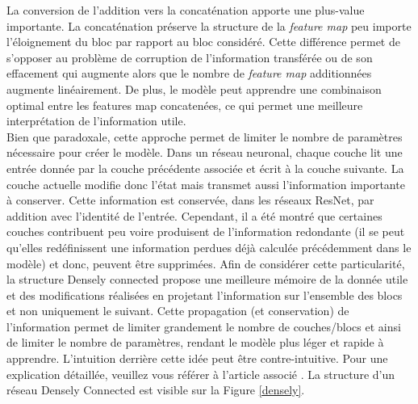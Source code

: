 \noindent La conversion de l'addition vers la concaténation apporte une plus-value importante. La concaténation préserve la structure de la \textit{feature map} peu importe l'éloignement du bloc par rapport au bloc considéré. Cette différence permet de s'opposer au problème de corruption de l'information transférée ou de son effacement qui augmente alors que le nombre de \textit{feature map} additionnées augmente linéairement. De plus, le modèle peut apprendre une combinaison optimal entre les features map concatenées, ce qui permet une meilleure interprétation de l'information utile. \\

\noindent Bien que paradoxale, cette approche permet de limiter le nombre de paramètres nécessaire pour créer le modèle. Dans un réseau neuronal, chaque couche lit une entrée donnée par la couche précédente associée et écrit à la couche suivante. La couche actuelle modifie donc l'état mais transmet aussi l'information importante à conserver. Cette information est conservée, dans les réseaux ResNet, par addition avec l'identité de l'entrée. Cependant, il a été montré que certaines couches contribuent peu voire produisent de l'information redondante (il se peut qu'elles redéfinissent une information perdues déjà calculée précédemment dans le modèle) et donc, peuvent être supprimées. Afin de considérer cette particularité, la structure Densely connected propose une meilleure mémoire de la donnée utile et des modifications réalisées en projetant l'information sur l'ensemble des blocs et non uniquement le suivant. Cette propagation (et conservation) de l'information permet de limiter grandement le nombre de couches/blocs et ainsi de limiter le nombre de paramètres, rendant le modèle plus léger et rapide à apprendre. L'intuition derrière cette idée peut être contre-intuitive. Pour une explication détaillée, veuillez vous référer à l'article associé \cite{densely}. La structure d'un réseau Densely Connected est visible sur la Figure \ref{densely}.\\

